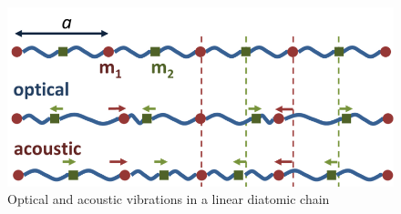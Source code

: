 \documentclass[%
 aip,
 amsmath,amssymb,
 reprint, floatfix%
]{revtex4-1}
\begin{document}
        \begin{figure}
            \centering
            \includegraphics[scale = 0.4]{Figures/800px-Optical_&_acoustic_vibrations.png}
            \caption{Optical and acoustic vibrations in a linear diatomic chain}
            \label{fig:op/ac}
        \end{figure}
\end{document}
